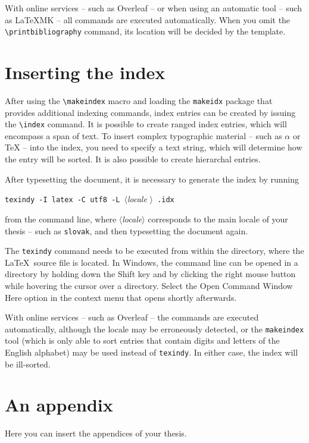 \documentclass[
  digital, %
  table,   %
  lof,     %
  lot,     %
]{fithesis3}
\begin{document}
With online services -- such as Overleaf -- or when using an
automatic tool -- such as \LaTeX MK -- all commands are executed
automatically. When you omit the \verb"\printbibliography" command,
its location will be decided by the template.

  \printbibliography[heading=bibintoc] %

\chapter{Inserting the index}
After using the \verb"\makeindex" macro and loading the
\texttt{makeidx} package that provides additional indexing
commands, index entries can be created by issuing the \verb"\index"
command. It is possible to create ranged index
entries, which will encompass a span of text.
To insert complex typographic material -- such as $\alpha$
 or \TeX{}  --
into the index, you need to specify a text string, which will
determine how the entry will be sorted. It is also possible to
create hierarchal entries. 

After typesetting the document, it is necessary to generate the
index by running
\begin{center}%
  \texttt{texindy -I latex -C utf8 -L }$\langle$\textit{locale}%
  $\rangle$\texttt{ \jobname.idx}
\end{center}
from the command line, where $\langle$\textit{locale}$\rangle$
corresponds to the main locale of your thesis -- such as
\texttt{slovak}, and then typesetting the document again.

The \texttt{texindy} command needs to be executed from within the
directory, where the \LaTeX\ source file is located. In Windows,
the command line can be opened in a directory by holding down the
\textsf{Shift} key and by clicking the right mouse button while
hovering the cursor over a directory. Select the \textsf{Open Command
Window Here} option in the context menu that opens shortly
afterwards.

With online services -- such as Overleaf -- the commands are
executed automatically, although the locale may be erroneously
detected, or the \texttt{makeindex} tool (which is only able to
sort entries that contain digits and letters of the English
alphabet) may be used instead of \texttt{texindy}. In either case,
the index will be ill-sorted.

  \makeatletter\thesis@blocks@clear\makeatother
  \printindex

\appendix %
\chapter{An appendix}
Here you can insert the appendices of your thesis.
\end{document}
